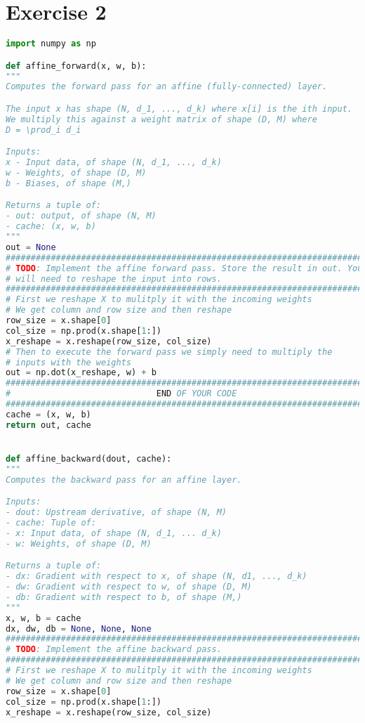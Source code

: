 \chapter{Exercise 2}




\begin{lstlisting}[language=Python, label=lst:layers.py, caption={layers.py}, basicstyle=\tiny]
import numpy as np

def affine_forward(x, w, b):
"""
Computes the forward pass for an affine (fully-connected) layer.

The input x has shape (N, d_1, ..., d_k) where x[i] is the ith input.
We multiply this against a weight matrix of shape (D, M) where
D = \prod_i d_i

Inputs:
x - Input data, of shape (N, d_1, ..., d_k)
w - Weights, of shape (D, M)
b - Biases, of shape (M,)

Returns a tuple of:
- out: output, of shape (N, M)
- cache: (x, w, b)
"""
out = None
#############################################################################
# TODO: Implement the affine forward pass. Store the result in out. You     #
# will need to reshape the input into rows.                                 #
#############################################################################
# First we reshape X to mulitply it with the incoming weights
# We get column and row size and then reshape
row_size = x.shape[0]
col_size = np.prod(x.shape[1:])
x_reshape = x.reshape(row_size, col_size)
# Then to execute the forward pass we simply need to multiply the
# inputs with the weights
out = np.dot(x_reshape, w) + b
#############################################################################
#                             END OF YOUR CODE                              #
#############################################################################
cache = (x, w, b)
return out, cache


def affine_backward(dout, cache):
"""
Computes the backward pass for an affine layer.

Inputs:
- dout: Upstream derivative, of shape (N, M)
- cache: Tuple of:
- x: Input data, of shape (N, d_1, ... d_k)
- w: Weights, of shape (D, M)

Returns a tuple of:
- dx: Gradient with respect to x, of shape (N, d1, ..., d_k)
- dw: Gradient with respect to w, of shape (D, M)
- db: Gradient with respect to b, of shape (M,)
"""
x, w, b = cache
dx, dw, db = None, None, None
#############################################################################
# TODO: Implement the affine backward pass.                                 #
#############################################################################
# First we reshape X to mulitply it with the incoming weights
# We get column and row size and then reshape
row_size = x.shape[0]
col_size = np.prod(x.shape[1:])
x_reshape = x.reshape(row_size, col_size)


\end{lstlisting}
